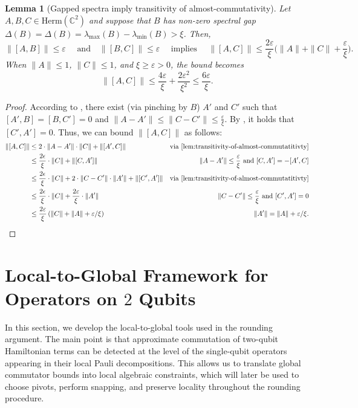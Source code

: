 \documentclass[11pt]{article}
\theoremstyle{plain}
\newtheorem{lemma}[theorem]{Lemma}
\newcommand{\eps}{\varepsilon}
\begin{document}
\begin{lemma}[Gapped spectra imply transitivity of almost-commutativity]\label{lem:transitivity-almost}
    Let $A,B,C \in \mathrm{Herm}(\mathbb{C}^{2})$ and suppose that $B$ has non-zero spectral gap $\Delta(B)=\Delta(B)=\lambda_{\max}(B) - \lambda_{\min}(B) > \xi$. Then, 
$$
\|[A,B]\| \leq \eps \quad \text{ and} \quad \|[B,C]\| \leq \eps \quad \text{ implies } \quad \|[A,C]\| \leq \frac{2\eps}{\xi}\Big(\|A\| + \|C\| + \frac{\eps}{\xi} \Big) .
$$
When $\|A\|\leq 1$, $\|C\|\leq 1$, and $\xi \geq  \eps >0$, the bound becomes \[\|[A, C]\| \leq \frac{4\eps}{\xi} + \frac{2\eps^2}{\xi^2} \leq \frac{6\eps}{\xi}.\]
\end{lemma}
\begin{proof}
 According to , there exist (via pinching by $B$) $A'$ and $C'$ such that $[A', B] = [B, C'] = 0$ and $\|A - A'\| \leq \|C - C'\| \leq \frac{\eps}{\xi}$. By , it holds that $[C', A'] = 0$. Thus, we can bound $\|[A, C]\|$ as follows:
    \begin{align*}
        \|[A,C]\| & \leq 2 \cdot \|A - A'\| \cdot \|C\| + \|[A', C]\| & \text{via \Cref{lem:transitivity-of-almost-commutatitivty}}\\
        &\leq \frac{2\epsilon}{\xi} \cdot \|C\| + \|[C, A']\| & \|A - A'\| \leq \frac{\eps}{\xi} \text{ and } [C,A'] = -[A',C]\\
        &\leq \frac{2\epsilon}{\xi} \cdot \|C\| + 2 \cdot \|C - C'\| \cdot \|A'\| + \|[C',A']\| & \text{via \Cref{lem:transitivity-of-almost-commutatitivty}}\\
        & \leq \frac{2\epsilon}{\xi} \cdot \|C\| + \frac{2\eps}{\xi} \cdot \|A'\| & \|C - C'\| \leq \frac{\eps}{\xi} \text{ and } [C', A'] = 0\\
        & \leq \frac{2\eps}{\xi} \left(\|C\| + \|A\| + \eps/\xi \right) & \|A'\| = \|A\| + \eps/\xi.
    \end{align*}
\end{proof}

\section{Local-to-Global Framework for Operators on $2$ Qubits}

In this section, we develop the local-to-global tools used in the rounding
argument.  The main point is that approximate commutation of two-qubit
Hamiltonian terms can be detected at the level of the single-qubit
operators appearing in their local Pauli decompositions.  This allows us to
translate global commutator bounds into local algebraic constraints, which
will later be used to choose pivots, perform snapping, and preserve locality
throughout the rounding procedure.
\end{document}
